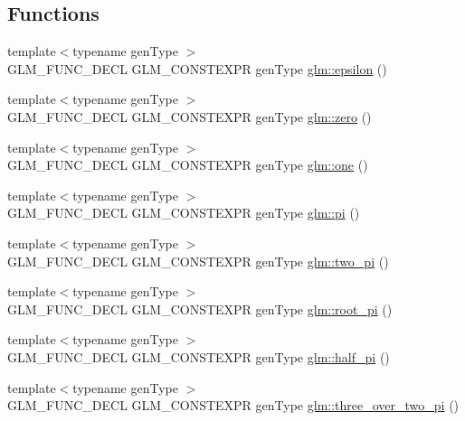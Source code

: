 \subsection*{Functions}
\begin{DoxyCompactItemize}
\item 
{\footnotesize template$<$typename gen\+Type $>$ }\\G\+L\+M\+\_\+\+F\+U\+N\+C\+\_\+\+D\+E\+CL G\+L\+M\+\_\+\+C\+O\+N\+S\+T\+E\+X\+PR gen\+Type \hyperlink{group__gtc__constants_ga2a1e57fc5592b69cfae84174cbfc9429}{glm\+::epsilon} ()
\item 
{\footnotesize template$<$typename gen\+Type $>$ }\\G\+L\+M\+\_\+\+F\+U\+N\+C\+\_\+\+D\+E\+CL G\+L\+M\+\_\+\+C\+O\+N\+S\+T\+E\+X\+PR gen\+Type \hyperlink{group__gtc__constants_ga788f5a421fc0f40a1296ebc094cbaa8a}{glm\+::zero} ()
\item 
{\footnotesize template$<$typename gen\+Type $>$ }\\G\+L\+M\+\_\+\+F\+U\+N\+C\+\_\+\+D\+E\+CL G\+L\+M\+\_\+\+C\+O\+N\+S\+T\+E\+X\+PR gen\+Type \hyperlink{group__gtc__constants_ga39c2fb227631ca25894326529bdd1ee5}{glm\+::one} ()
\item 
{\footnotesize template$<$typename gen\+Type $>$ }\\G\+L\+M\+\_\+\+F\+U\+N\+C\+\_\+\+D\+E\+CL G\+L\+M\+\_\+\+C\+O\+N\+S\+T\+E\+X\+PR gen\+Type \hyperlink{group__gtc__constants_ga94bafeb2a0f23ab6450fed1f98ee4e45}{glm\+::pi} ()
\item 
{\footnotesize template$<$typename gen\+Type $>$ }\\G\+L\+M\+\_\+\+F\+U\+N\+C\+\_\+\+D\+E\+CL G\+L\+M\+\_\+\+C\+O\+N\+S\+T\+E\+X\+PR gen\+Type \hyperlink{group__gtc__constants_gaa5276a4617566abcfe49286f40e3a256}{glm\+::two\+\_\+pi} ()
\item 
{\footnotesize template$<$typename gen\+Type $>$ }\\G\+L\+M\+\_\+\+F\+U\+N\+C\+\_\+\+D\+E\+CL G\+L\+M\+\_\+\+C\+O\+N\+S\+T\+E\+X\+PR gen\+Type \hyperlink{group__gtc__constants_ga261380796b2cd496f68d2cf1d08b8eb9}{glm\+::root\+\_\+pi} ()
\item 
{\footnotesize template$<$typename gen\+Type $>$ }\\G\+L\+M\+\_\+\+F\+U\+N\+C\+\_\+\+D\+E\+CL G\+L\+M\+\_\+\+C\+O\+N\+S\+T\+E\+X\+PR gen\+Type \hyperlink{group__gtc__constants_ga0c36b41d462e45641faf7d7938948bac}{glm\+::half\+\_\+pi} ()
\item 
{\footnotesize template$<$typename gen\+Type $>$ }\\G\+L\+M\+\_\+\+F\+U\+N\+C\+\_\+\+D\+E\+CL G\+L\+M\+\_\+\+C\+O\+N\+S\+T\+E\+X\+PR gen\+Type \hyperlink{group__gtc__constants_gae94950df74b0ce382b1fc1d978ef7394}{glm\+::three\+\_\+over\+\_\+two\+\_\+pi} ()

\end{DoxyCompactItemize}
